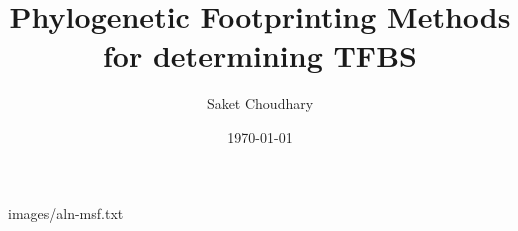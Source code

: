 \documentclass[10pt]{article}
\title{Phylogenetic Footprinting Methods for determining TFBS}
\date{\today}
\author{Saket Choudhary}
\begin{document}
\begin{texshade}{images/aln-msf.txt}
\end{texshade}
\end{document}
